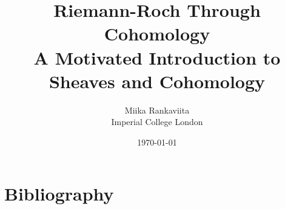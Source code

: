 \documentclass[12pt]{article}
\begin{document}
\title{Riemann-Roch Through Cohomology\\
        \large A Motivated Introduction to Sheaves and Cohomology}
\author{Miika Rankaviita\\Imperial College London}
\date{\today}
\maketitle
\tableofcontents

\theoremstyle{plain}
\newtheorem{thm}{Theorem}[section]
\newtheorem{cor}{Corollary}[thm]
\newtheorem{prop}[thm]{Proposition}
\newtheorem{lemm}[thm]{Lemma}
\newtheorem*{rem}{Remark}
\theoremstyle{definition}
\newtheorem{defin}[thm]{Definition}
\newtheorem{ex}[thm]{Example}


\newcommand{\diffs}[1]{H^0(X,K_X\otimes\mathcal{L}(#1)^{\vee})}
\newcommand{\dual}[1]{H^1(X,\mathcal{L}(#1))^{\vee}}
\newcommand{\duals}{H^1(X,\mathcal{L}(\kern.08em\bullet\kern.08em))^{\vee}}








\section{Bibliography}


\end{document}
